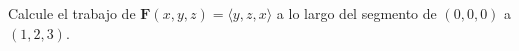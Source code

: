 Calcule el trabajo de $\mathbf{F}(x,y,z)=\langle y,z,x\rangle$ a lo largo del segmento de $(0,0,0)$ a $(1,2,3)$.
